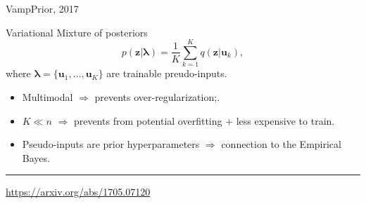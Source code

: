 \documentclass{beamer}
\newcommand{\bu}{\mathbf{u}}
\newcommand{\bz}{\mathbf{z}}
\newcommand{\blambda}{\boldsymbol{\lambda}}
\begin{document}
\begin{frame}{VampPrior, 2017}
	\begin{block}{Variational Mixture of posteriors}
		\[
		p(\bz | \blambda) = \frac{1}{K} \sum_{k=1}^K q(\bz | \bu_k),
		\]
		where $\blambda = \{\bu_1, \dots, \bu_K\}$ are trainable preudo-inputs.
	\end{block}
	\begin{itemize}
		\item Multimodal $\Rightarrow$ prevents over-regularization;.
		\item $K \ll n$ $\Rightarrow$ prevents from potential overfitting + less expensive to train.
		\item Pseudo-inputs are prior hyperparameters $\Rightarrow$ connection to the Empirical Bayes.
	\end{itemize}
	\vfill
	\hrule\medskip
	{\scriptsize \href{https://arxiv.org/abs/1705.07120}{https://arxiv.org/abs/1705.07120}}
\end{frame}
\end{document}
